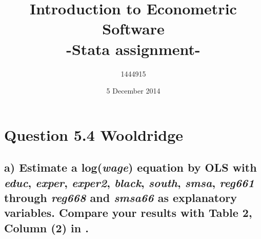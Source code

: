 \documentclass[a4paper, 12pt, twoside]{article}
\begin{document}
\thispagestyle{empty}
\title{Introduction to Econometric Software\\
-Stata assignment-}
\author{1444915}
\date{5 December 2014}
\maketitle
\newpage

\setcounter{page}{2}

\tableofcontents{}
\newpage




\section*{Question 5.4 Wooldridge}



\subsection*{a) Estimate a log(\textit{wage}) equation by OLS with \textit{educ}, \textit{exper}, \textit{exper2}, \textit{black}, \textit{south}, \textit{smsa}, \textit{reg661} through \textit{reg668} and \textit{smsa66} as explanatory variables. Compare your results with Table 2, Column (2) in \cite{Card}.}
\end{document}
